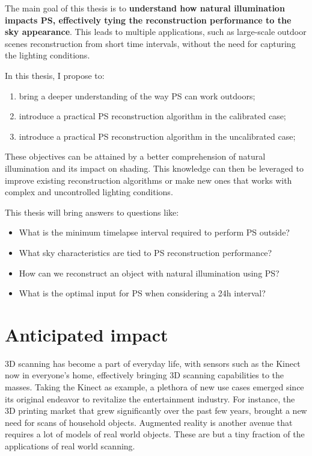 The main goal of this thesis is to \textbf{understand how natural illumination impacts PS, effectively tying the reconstruction performance to the sky appearance}. This leads to multiple applications, such as large-scale outdoor scenes reconstruction from short time intervals, without the need for capturing the lighting conditions.

In this thesis, I propose to:
\begin{enumerate}
  \item bring a deeper understanding of the way PS can work outdoors;
  \item introduce a practical PS reconstruction algorithm in the calibrated case;
  \item introduce a practical PS reconstruction algorithm in the uncalibrated case;
\end{enumerate}
These objectives can be attained by a better comprehension of natural illumination and its impact on shading. This knowledge can then be leveraged to improve existing reconstruction algorithms or make new ones that works with complex and uncontrolled lighting conditions.

This thesis will bring answers to questions like:
\begin{itemize}
  \item What is the minimum timelapse interval required to perform PS outside?
  \item What sky characteristics are tied to PS reconstruction performance?
  \item How can we reconstruct an object with natural illumination using PS?
  \item What is the optimal input for PS when considering a 24h interval?
\end{itemize}

\section{Anticipated impact}

3D scanning has become a part of everyday life, with sensors such as the Kinect now in everyone's home, effectively bringing 3D scanning capabilities to the masses. Taking the Kinect as example, a plethora of new use cases emerged since its original endeavor to revitalize the entertainment industry. For instance, the 3D printing market that grew significantly over the past few years, brought a new need for scans of household objects. Augmented reality is another avenue that requires a lot of models of real world objects. These are but a tiny fraction of the applications of real world scanning.

